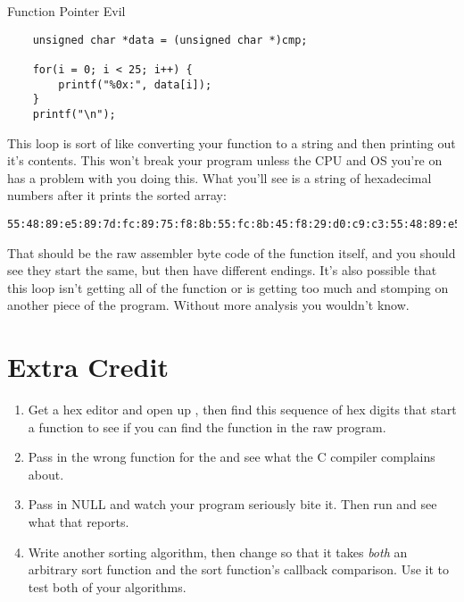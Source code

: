 \begin{code}{Function Pointer Evil}
\begin{lstlisting}
    unsigned char *data = (unsigned char *)cmp;

    for(i = 0; i < 25; i++) {
        printf("%0x:", data[i]);
    }
    printf("\n");
\end{lstlisting}
\end{code}

This loop is sort of like converting your function to a string and then
printing out it's contents.  This won't break your program unless the CPU and
OS you're on has a problem with you doing this.  What you'll see is a string of
hexadecimal numbers after it prints the sorted array:

\begin{Verbatim}
55:48:89:e5:89:7d:fc:89:75:f8:8b:55:fc:8b:45:f8:29:d0:c9:c3:55:48:89:e5:89:
\end{Verbatim}

That should be the raw assembler byte code of the function itself, and you
should see they start the same, but then have different endings.  It's also
possible that this loop isn't getting all of the function or is getting too
much and stomping on another piece of the program.  Without more analysis
you wouldn't know.

\section{Extra Credit}

\begin{enumerate}
\item Get a hex editor and open up , then find this sequence
    of hex digits that start a function to see if you can find the function
    in the raw program.
\item Pass in the wrong function for the  and see what
    the C compiler complains about.
\item Pass in NULL and watch your program seriously bite it.  Then run
     and see what that reports.
\item Write another sorting algorithm, then change  so
    that it takes \emph{both} an arbitrary sort function and the sort function's
    callback comparison.  Use it to test both of your algorithms.
\end{enumerate}


